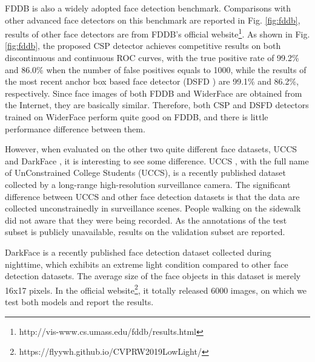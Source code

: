 FDDB \cite{fddbTech} is also a widely adopted face detection benchmark. Comparisons with other advanced face detectors on this benchmark are reported in Fig. \ref{fig:fddb}, results of other face detectors are from FDDB's official website\footnote{http://vis-www.cs.umass.edu/fddb/results.html}. As shown in Fig. \ref{fig:fddb}, the proposed CSP detector achieves competitive results on both discontinuous and continuous ROC curves, with the true positive rate of 99.2\% and 86.0\% when the number of false positives equals to 1000, while the results of the most recent anchor box based face detector (DSFD \cite{li2018dsfd}) are 99.1\% and 86.2\%, respectively. Since face images of both FDDB and WiderFace are obtained from the Internet, they are basically similar. Therefore, both CSP and DSFD detectors trained on WiderFace perform quite good on FDDB, and there is little performance difference between them.

However, when evaluated on the other two quite different face datasets, UCCS \cite{uccs} and DarkFace \cite{wei2018deep}, it is interesting to see some difference.
UCCS \cite{uccs}, with the full name of UnConstrained College Students (UCCS), is a recently published dataset collected by a long-range high-resolution surveillance camera. The significant difference between UCCS \cite{uccs} and other face detection datasets is that the data are collected unconstrainedly in surveillance scenes. People walking on the sidewalk did not aware that they were being recorded. As the annotations of the test subset is publicly unavailable, results on the validation subset are reported.

DarkFace \cite{wei2018deep} is a recently published face detection dataset collected during nighttime, which exhibits an extreme light condition compared to other face detection datasets. The average size of the face objects in this dataset is merely 16x17 pixels. In the official website\footnote{https://flyywh.github.io/CVPRW2019LowLight/}, it totally released 6000 images, on which we test both models and report the results.

